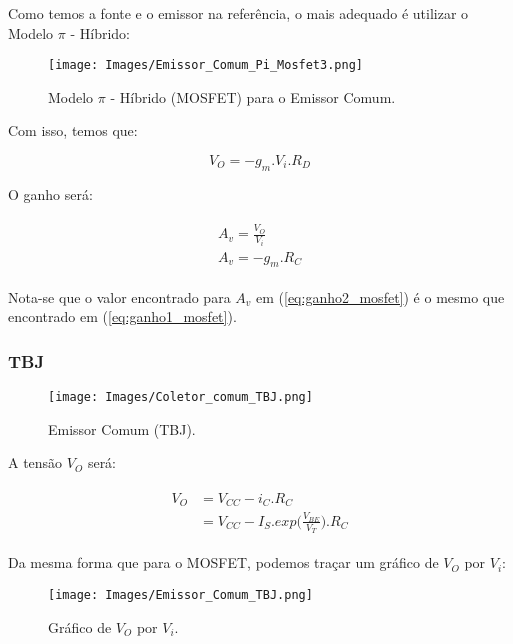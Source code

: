 \documentclass[12pt]{article}
\begin{document}
Como temos a fonte e o emissor na referência, o mais adequado é utilizar o Modelo $\pi$ - Híbrido:

\begin{figure}[H]
  \begin{center}
    \texttt{[image: Images/Emissor\_Comum\_Pi\_Mosfet3.png]}
  \end{center}
  \caption{Modelo $\pi$ - Híbrido (MOSFET) para o Emissor Comum.}
\end{figure}

Com isso, temos que:

$$
  V_O = -g_m . V_i . R_D
$$

O ganho será:

\begin{align}
  \begin{split}
    A_v = \frac{V_O}{V_i} \\
    A_v = - g_m . R_C
  \end{split}
  \label{eq:ganho2_mosfet}
\end{align}

Nota-se que o valor encontrado para $A_v$ em (\ref{eq:ganho2_mosfet}) é o mesmo que encontrado em (\ref{eq:ganho1_mosfet}).

\subsubsection{TBJ}

\begin{figure}[H]
  \begin{center}
    \texttt{[image: Images/Coletor\_comum\_TBJ.png]}
  \end{center}
  \caption{Emissor Comum (TBJ).}
\end{figure}

A tensão $V_O$ será:

\begin{align*}
  \begin{split}
    V_O &= V_{CC} - i_C . R_C \\
        &= V_{CC} - I_S . exp \Big (\frac{V_{BE}}{V_T} \Big ) . R_C
  \end{split}
\end{align*}

Da mesma forma que para o MOSFET, podemos traçar um gráfico de $V_O$ por $V_i$:

\begin{figure}[H]
  \begin{center}
    \texttt{[image: Images/Emissor\_Comum\_TBJ.png]}
  \end{center}
  \caption{Gráfico de $V_O$ por $V_i$.}
\end{figure}
\end{document}
